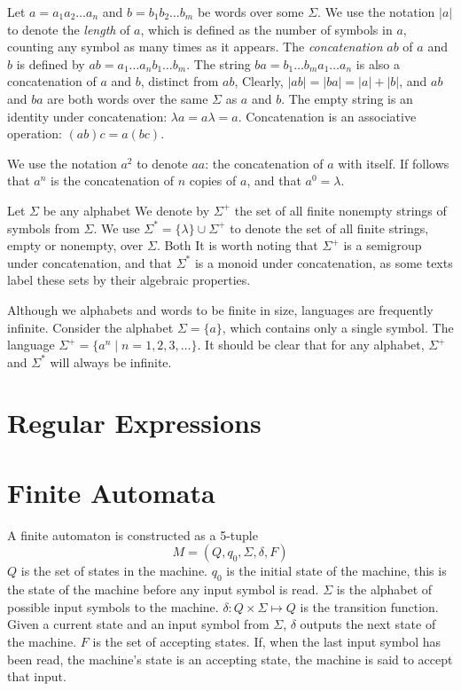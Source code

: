 \documentclass{bcthesis}
\newcommand{\footcite}[2]{\footnote{\cite[pg.~{#2}]{#1}}}
\renewcommand{\footcite}[2]{\cite[pg.~{#2}]{#1}}
\begin{document}
		Let $a = a_1 a_2 \dots a_n$ and $b = b_1 b_2 \dots b_m$ be words over some $\Sigma$. 
		We use the notation $|a|$ to denote the \textit{length} of $a$, which is defined as the number of symbols in $a$, counting any symbol as many times as it appears.
		The \textit{concatenation} $ab$ of $a$ and $b$ is defined by $ab = a_1 \dots a_n b_1 \dots b_m$.
		The string $ba = b_1 \dots b_m a_1 \dots a_n$ is also a concatenation of $a$ and $b$, distinct from $ab$,
		Clearly, $|ab| = |ba| = |a| + |b|$, and $ab$ and $ba$ are both words over the same $\Sigma$ as $a$ and $b$.
		The empty string is an identity under concatenation: $\lambda a = a \lambda = a$.
		Concatenation is an associative operation: $(ab)c = a(bc)$.\footcite{lemmings}{1--3}

		We use the notation $a^2$ to denote $aa$: the concatenation of $a$ with itself. 
		If follows that $a^n$ is the concatenation of $n$ copies of $a$, and that $a^0 = \lambda$.\footcite{salomaa}{1}

		Let $\Sigma$ be any alphabet
		We denote by $\Sigma^+$ the set of all finite nonempty strings of symbols from $\Sigma$. 
		We use $\Sigma^* = \{ \lambda \} \cup \Sigma^+$ to denote the set of all finite strings, empty or nonempty, over $\Sigma$.
		Both 
		It is worth noting that $\Sigma^+$ is a semigroup under concatenation, and that $\Sigma^*$ is a monoid under concatenation, as some texts label these sets by their algebraic properties.\footcite{salomaa}{1}

		Although we alphabets and words to be finite in size, languages are frequently infinite.
		Consider the alphabet $\Sigma = \{ a \}$, which contains only a single symbol.
		The language $\Sigma^+ = \{ a^n \mid n = 1, 2, 3, \dots \}$.
		It should be clear that for any alphabet, $\Sigma^+$ and $\Sigma^*$ will always be infinite.


	\section{Regular Expressions} %
	\label{sec:regular_expressions}
		

	\section{Finite Automata} %
	\label{sec:finite_automata}
		A finite automaton is constructed as a 5-tuple
		\[
			M = (Q, q_0, \Sigma, \delta, F)
		\]
		$Q$ is the set of states in the machine.
		$q_0$ is the initial state of the machine, this is the state of the machine before any input symbol is read.
		$\Sigma$ is the alphabet of possible input symbols to the machine.
		$\delta: Q \times \Sigma \mapsto Q$ is the transition function.
		Given a current state and an input symbol from $\Sigma$, $\delta$ outputs the next state of the machine.
		$F$ is the set of accepting states.
		If, when the last input symbol has been read, the machine's state is an accepting state, the machine is said to accept that input.
\end{document}
